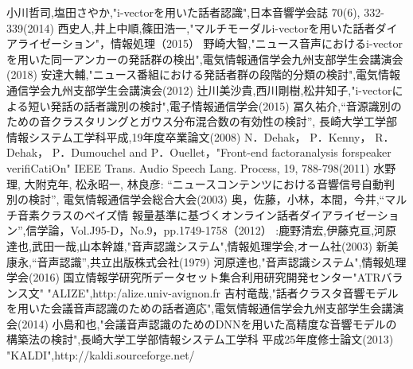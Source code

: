 \begin{thebibliography}{99}     %
小川哲司,塩田さやか,"i-vectorを用いた話者認識",日本音響学会誌 70(6), 332-339(2014)
西史人,井上中順,篠田浩一,"マルチモーダルi-vectorを用いた話者ダイアライゼーション"，情報処理（2015）
野崎大智,"ニュース音声におけるi-vectorを用いた同一アンカーの発話群の検出",電気情報通信学会九州支部学生会講演会(2018)
安達大輔,"ニュース番組における発話者群の段階的分類の検討",電気情報通信学会九州支部学生会講演会(2012)
辻川美沙貴,西川剛樹,松井知子,"i-vectorによる短い発話の話者識別の検討",電子情報通信学会(2015)
冨久祐介,“音源識別のための音クラスタリングとガウス分布混合数の有効性の検討”,
長崎大学工学部情報システム工学科平成,19年度卒業論文(2008)
N．Dehak， P．Kenny， R．Dehak， P．Dumouchel and P．Ouellet，"Front-end factoranalysis forspeaker verifiCatiOn" IEEE Trans. Audio Speech Lang. Process, 19, 788-798(2011)
水野理, 大附克年, 松永昭一, 林良彦: “ニュースコンテンツにおける音響信号自動判
別の検討”, 電気情報通信学会総合大会(2003)
奥，佐藤，小林，本間，今井,“マルチ音素クラスのベイズ情
報量基準に基づくオンライン話者ダイアライゼーション”,信学論，Vol.J95-D，No.9，pp.1749-1758（2012）
:鹿野清宏,伊藤克亘,河原達也,武田一哉,山本幹雄,"音声認識システム",情報処理学会,オーム社(2003)
新美康永,“音声認識”,共立出版株式会社(1979)
河原達也,"音声認識システム",情報処理学会(2016)
国立情報学研究所データセット集合利用研究開発センター"ATRバランス文"
"ALIZE",http:/alize.univ-avignon.fr
吉村竜哉,"話者クラスタ音響モデルを用いた会議音声認識のための話者適応",電気情報通信学会九州支部学生会講演会(2014)
小島和也,"会議音声認識のためのDNNを用いた高精度な音響モデルの構築法の検討",長崎大学工学部情報システム工学科 平成25年度修士論文(2013)
"KALDI",http://kaldi.sourceforge.net/
\end{thebibliography}
